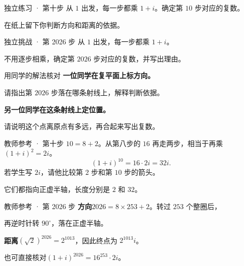 \documentclass[aspectratio=169,10pt]{beamer}
\newcommand{\accenttext}[1]{{\color{teal}\bfseries #1}}
\newcommand{\breath}{\par\vspace{3.5mm}}
\begin{document}
\begin{campuspractice}{独立练习 · 第十步}
从 $1$ 出发，每一步都乘 $1+i$。确定第 $10$ 步对应的复数。\breath
在纸上留下你判断方向和距离的依据。
\end{campuspractice}
\begin{campuspractice}{独立挑战 · 第 2026 步}
从 $1$ 出发，每一步都乘 $1+i$。\breath
不用逐步相乘，确定第 $2026$ 步对应的复数，并写出理由。
\end{campuspractice}

\begin{frame}{用同学的解法核对}
\accenttext{一位同学在复平面上标方向。}\breath
请指出第 $2026$ 步落在哪条射线上，解释判断依据。
\vspace{7mm}
\par\accenttext{另一位同学在这条射线上定位置。}\breath
请说明这个点离原点有多远，再合起来写出复数。
\end{frame}
\ifdefined\TeacherEdition
\begin{frame}{教师参考 · 第十步}
$10=8+2$。从第八步的 $16$ 再走两步，相当于再乘 $(1+i)^2=2i$。
\[
  (1+i)^{10}=16\cdot 2i=\boxed{32i}.
\]
若学生写 $2i$，请他比较第 $2$ 步和第 $10$ 步的箭头。\par
它们都指向正虚半轴，长度分别是 $2$ 和 $32$。
\end{frame}
\begin{frame}{教师参考 · 第 2026 步}
\accenttext{方向}\quad $2026=8\times253+2$。转过 $253$ 个整圈后，\par
再逆时针转 $90^\circ$，落在正虚半轴。\breath
\accenttext{距离}\quad $(\sqrt2)^{2026}=2^{1013}$，因此终点为 $\boxed{2^{1013}i}$。\breath
也可直接核对\quad $(1+i)^{2026}=16^{253}\cdot 2i$。
\end{frame}
\fi
\end{document}
